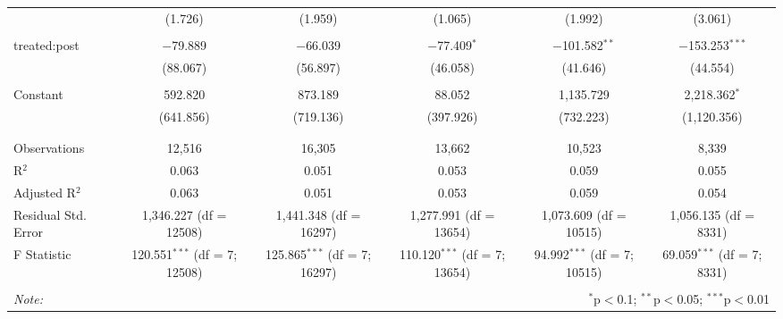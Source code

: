 \begin{table}[!htbp]
\begin{tabular}{@{\extracolsep{5pt}}lccccc}
  & (1.726) & (1.959) & (1.065) & (1.992) & (3.061) \\ 
  & & & & & \\ 
 treated:post & $-$79.889 & $-$66.039 & $-$77.409$^{*}$ & $-$101.582$^{**}$ & $-$153.253$^{***}$ \\ 
  & (88.067) & (56.897) & (46.058) & (41.646) & (44.554) \\ 
  & & & & & \\ 
 Constant & 592.820 & 873.189 & 88.052 & 1,135.729 & 2,218.362$^{*}$ \\ 
  & (641.856) & (719.136) & (397.926) & (732.223) & (1,120.356) \\ 
  & & & & & \\ 
\hline \\[-1.8ex] 
Observations & 12,516 & 16,305 & 13,662 & 10,523 & 8,339 \\ 
R$^{2}$ & 0.063 & 0.051 & 0.053 & 0.059 & 0.055 \\ 
Adjusted R$^{2}$ & 0.063 & 0.051 & 0.053 & 0.059 & 0.054 \\ 
Residual Std. Error & 1,346.227 (df = 12508) & 1,441.348 (df = 16297) & 1,277.991 (df = 13654) & 1,073.609 (df = 10515) & 1,056.135 (df = 8331) \\ 
F Statistic & 120.551$^{***}$ (df = 7; 12508) & 125.865$^{***}$ (df = 7; 16297) & 110.120$^{***}$ (df = 7; 13654) & 94.992$^{***}$ (df = 7; 10515) & 69.059$^{***}$ (df = 7; 8331) \\ 
\hline 
\hline \\[-1.8ex] 
\textit{Note:}  & \multicolumn{5}{r}{$^{*}$p$<$0.1; $^{**}$p$<$0.05; $^{***}$p$<$0.01} \\ 
\end{tabular} 
\end{table} 
